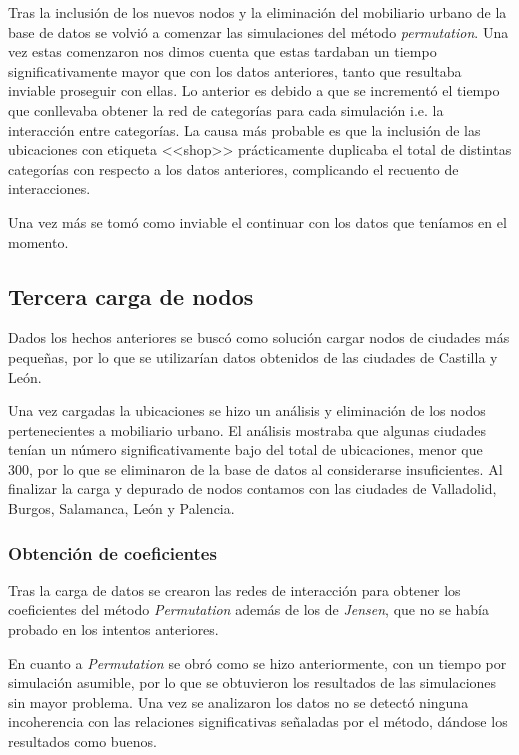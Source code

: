 Tras la inclusión de los nuevos nodos y la eliminación del mobiliario urbano de la base de datos se volvió a comenzar las simulaciones del método \textit{permutation}.
Una vez estas comenzaron nos dimos cuenta que estas tardaban un tiempo significativamente mayor que con los datos anteriores, tanto que resultaba inviable proseguir con ellas. Lo anterior es debido a que se incrementó el tiempo que conllevaba obtener la red de categorías para cada simulación i.e. la interacción entre categorías. La causa más probable es que la inclusión de las ubicaciones con etiqueta <<shop>> prácticamente duplicaba el total de distintas categorías con respecto a los datos anteriores, complicando el recuento de interacciones.

Una vez más se tomó como inviable el continuar con los datos que teníamos en el momento.

\subsection{Tercera carga de nodos}
Dados los hechos anteriores se buscó como solución cargar nodos de ciudades más pequeñas, por lo que se utilizarían datos obtenidos de las ciudades de Castilla y León. 

Una vez cargadas la ubicaciones se hizo un análisis y eliminación de los nodos pertenecientes a mobiliario urbano. El análisis mostraba que algunas ciudades tenían un número significativamente bajo del total de ubicaciones, menor que 300, por lo que se eliminaron de la base de datos al considerarse insuficientes. Al finalizar la carga y depurado de nodos contamos con las ciudades de Valladolid, Burgos, Salamanca, León y Palencia.

\subsubsection{Obtención de coeficientes}

Tras la carga de datos se crearon las redes de interacción para obtener los coeficientes del método \textit{Permutation} además de los de \textit{Jensen}, que no se había probado en los intentos anteriores.

En cuanto a \textit{Permutation} se obró como se hizo anteriormente, con un tiempo por simulación asumible, por lo que se obtuvieron los resultados de las simulaciones sin mayor problema. Una vez se analizaron los datos no se detectó ninguna incoherencia con las relaciones significativas señaladas por el método, dándose los resultados como buenos.

